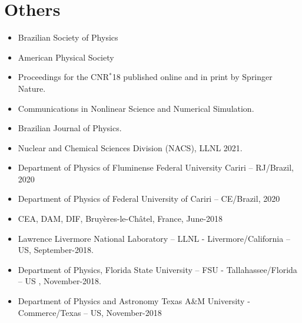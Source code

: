 \documentclass[12pt,a4paper,sans]{moderncv}
\begin{document}


\section{Others}
{
	\begin{itemize}
	\item Brazilian Society of Physics
	\item American Physical Society
        \end{itemize}
}

{
  \begin{itemize}
  \item Proceedings for the CNR$^{*}$18 published online and in print by Springer Nature.
  \item Communications in Nonlinear Science and Numerical Simulation.
   \item Brazilian Journal of Physics.
  \end{itemize}
}

{
  \begin{itemize}
    \item Nuclear and Chemical Sciences Division (NACS), LLNL 2021.
  \item  Department of Physics of Fluminense Federal University Cariri – RJ/Brazil, 2020 
  \item Department of Physics of Federal University of Cariri – CE/Brazil, 2020  
  \item CEA, DAM, DIF, Bruyères-le-Châtel, France, June-2018
  \item Lawrence Livermore National Laboratory -- LLNL - Livermore/California -- US, September-2018.
  \item Department of Physics, Florida State University -- FSU - Tallahassee/Florida -- US , November-2018.
  \item Department of Physics and Astronomy Texas A\&M University - Commerce/Texas -- US, November-2018
  \end{itemize}
}
\end{document}
